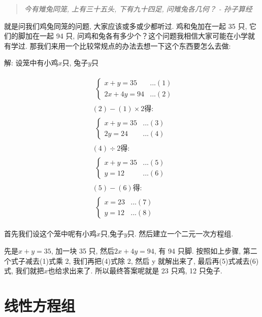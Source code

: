 \begin{quotation}
  \textit{今有雉兔同笼, 上有三十五头, 下有九十四足, 问雉兔各几何？ - 孙子算经}
\end{quotation}

就是问我们鸡兔同笼的问题, 大家应该或多或少都听过. 鸡和兔加在一起 35 只, 它们的脚加在一起 94 只, 问鸡和兔各有多少个？这个问题我相信大家可能在小学就有学过. 那我们来用一个比较常规点的办法去想一下这个东西要怎么去做:

解: 设笼中有小鸡$x$只, 兔子$y$只

\begin{align*}
  & \begin{split} \begin{cases} x + y = 35 & ...(1) \\ 2x + 4y = 94 & ...(2) \end{cases}  \end{split} \\
  & (2)-(1)\times 2\mbox{得:}\\
  & \begin{split} \begin{cases} x+y=35 & ...(3) \\ 2y=24  & ...(4) \end{cases} \end{split} \\
	& (4)\div 2 \mbox{得:} \\
	& \begin{split} \begin{cases} x+y=35 & ...(5) \\ y=12 & ...(6) \end{cases} \end{split} \\
	& (5)-(6) \mbox{得:} \\
	& \begin{split} \begin{cases} x=23 & ...(7) \\ y=12 & ...(8) \end{cases} \end{split}
\end{align*}

首先我们设这个笼中呢有小鸡$x$只,兔子$y$只. 然后建立一个二元一次方程组. 

先是$x+y=35$, 加一块 35 只, 然后$2x+4y=94$, 有 94 只脚. 按照如上步骤, 第二个式子减去(1)式乘 2, 我们再把(4)式除 2, 然后 y 就解出来了, 最后再(5)式减去(6)式, 我们就把$x$也给求出来了. 所以最终答案呢就是 23 只鸡, 12 只兔子. 

\section{线性方程组}

